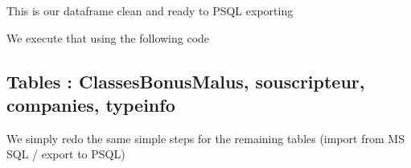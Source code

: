 This is our dataframe clean and ready to PSQL exporting
\begin{figure}[H]
\centering
{}
\end{figure}

We execute that using the following code
\begin{figure}[H]
\centering
{}
\end{figure}

\subsection{Tables : ClassesBonusMalus, souscripteur, companies, typeinfo}

We simply redo the same simple steps for the remaining tables (import from MS SQL / export to PSQL)
\begin{figure}[H]
\centering
{}
\end{figure}

\begin{figure}[H]
\centering
{}
\end{figure}